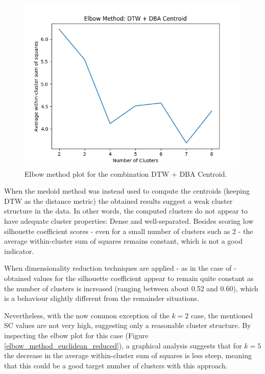 \documentclass[9pt,journal,compsoc]{IEEEtran}
\begin{document}
\begin{figure}[ht]
	\centering
	\includegraphics[scale=0.5]{images/raw_dtw_DBA.png}
	\caption{Elbow method plot for the combination DTW + DBA Centroid.}
	\label{elbow_method_dba}
\end{figure}

When the medoid method was instead used to compute the centroids (keeping DTW as the distance metric) the obtained results suggest a weak cluster structure in the data. In other words, the computed clusters do not appear to have adequate cluster properties: Dense and well-separated. Besides scoring low silhouette coefficient scores - even for a small number of clusters such as 2 - the average within-cluster sum of squares remains constant, which is not a good indicator.

When dimensionality reduction techniques are applied - as in the case of \cite{abreu2012using} - obtained values for the silhouette coefficient appear to remain quite constant as the number of clusters is increased (ranging between about 0.52 and 0.60), which is a behaviour slightly different from the remainder situations.

Nevertheless, with the now common exception of the $k=2$ case, the mentioned SC values are not very high, suggesting only a reasonable cluster structure. By inspecting the elbow plot for this case (Figure \ref{elbow_method_euclidean_reduced}), a graphical analysis suggests that for $k = 5$ the decrease in the average within-cluster sum of squares is less steep, meaning that this could be a good target number of clusters with this approach.
\end{document}
